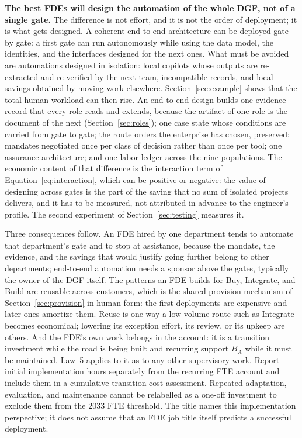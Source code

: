 \textbf{The best FDEs will design the automation of the whole DGF, not of a single gate.} The difference is
not effort, and it is not the order of deployment; it is what gets designed. A coherent end-to-end
architecture can be deployed gate by gate: a first gate can run autonomously while using the data
model, the identities, and the interfaces designed for the next ones. What must be avoided are
automations designed in isolation: local copilots whose outputs are re-extracted and re-verified by the
next team, incompatible records, and local savings obtained by moving work elsewhere.
Section~\ref{sec:example} shows that the total human workload can then rise. An end-to-end design
builds one evidence record that every role reads and extends, because the
artifact of one role is the document of the next (Section~\ref{sec:roles}); one case state whose
conditions are carried from gate to gate; the route orders the enterprise has chosen, preserved; mandates negotiated once
per class of decision rather than once per tool; one assurance architecture; and one labor ledger
across the nine populations. The economic content of that difference is the interaction term of
Equation~\eqref{eq:interaction}, which can be positive or negative: the value of designing across gates
is the part of the saving that no sum of isolated projects delivers, and it has to be measured, not
attributed in advance to the engineer's profile. The second experiment of Section~\ref{sec:testing}
measures it.

Three consequences follow. An FDE hired by one department tends to automate that department's gate and
to stop at assistance, because the mandate, the evidence, and the savings that would justify going
further belong to other departments; end-to-end automation needs a sponsor above the gates, typically
the owner of the DGF itself. The patterns an FDE builds for Buy, Integrate, and Build are reusable across
customers, which is the shared-provision mechanism of Section~\ref{sec:provision} in human form: the
first deployments are expensive and later ones amortize them. Reuse is one way a low-volume route such
as Integrate becomes economical; lowering its exception effort, its review, or its upkeep are others. And the FDE's own work belongs in the account: it is a transition
investment while the road is being built and recurring support $B_A$ while it must be maintained.
Law~5 applies to it as to any other supervisory work. Report initial implementation hours separately
from the recurring FTE account and include them in a cumulative transition-cost assessment. Repeated
adaptation, evaluation, and maintenance cannot be relabelled as a one-off investment to exclude them
from the 2033 FTE threshold. The title names this implementation perspective; it does not assume that
an FDE job title itself predicts a successful deployment.

